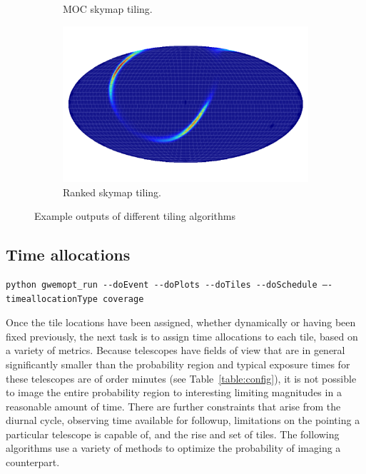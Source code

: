 \documentclass[twocolumn]{aastex61}
\begin{document}
\begin{figure}[b]
\begin{subfigure}[b]{0.4\textwidth}
        \caption{MOC skymap tiling.}
        \label{fig:tiling_moc}
    \end{subfigure}
    \begin{subfigure}[b]{0.4\textwidth}
        \includegraphics[width=\textwidth]{tiling_ranked}
        \caption{Ranked skymap tiling.}
        \label{fig:tiling_ranked}
    \end{subfigure}
    \caption{Example outputs of different tiling algorithms}\label{fig:tiling}
\end{figure}


\subsection{Time allocations}
\begin{lstlisting}
python gwemopt_run --doEvent --doPlots --doTiles --doSchedule —-timeallocationType coverage
\end{lstlisting}
Once the tile locations have been assigned, whether dynamically or having been fixed previously, the next task is to assign time allocations to each tile, based on a variety of metrics. 
Because telescopes have fields of view that are in general significantly smaller than the probability region and typical exposure times for these telescopes are of order minutes (see Table~\ref{table:config}), it is not possible to image the entire probability region to interesting limiting magnitudes in a reasonable amount of time.
There are further constraints that arise from the diurnal cycle, observing time available for followup, limitations on the pointing a particular telescope is capable of, and the rise and set of tiles.
The following algorithms use a variety of methods to optimize the probability of imaging a counterpart.
\end{document}
